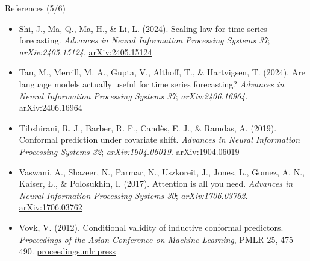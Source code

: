 \begin{frame}{References (5/6)}
\begin{itemize}
    \item Shi, J., Ma, Q., Ma, H., \& Li, L. (2024). Scaling law for time series forecasting. \textit{Advances in Neural Information Processing Systems 37}; \textit{arXiv:2405.15124}. \href{https://arxiv.org/abs/2405.15124}{arXiv:2405.15124}
    \item Tan, M., Merrill, M. A., Gupta, V., Althoff, T., \& Hartvigsen, T. (2024). Are language models actually useful for time series forecasting? \textit{Advances in Neural Information Processing Systems 37}; \textit{arXiv:2406.16964}. \href{https://arxiv.org/abs/2406.16964}{arXiv:2406.16964}
    \item Tibshirani, R. J., Barber, R. F., Candès, E. J., \& Ramdas, A. (2019). Conformal prediction under covariate shift. \textit{Advances in Neural Information Processing Systems 32}; \textit{arXiv:1904.06019}. \href{https://arxiv.org/abs/1904.06019}{arXiv:1904.06019}
    \item Vaswani, A., Shazeer, N., Parmar, N., Uszkoreit, J., Jones, L., Gomez, A. N., Kaiser, Ł., \& Polosukhin, I. (2017). Attention is all you need. \textit{Advances in Neural Information Processing Systems 30}; \textit{arXiv:1706.03762}. \href{https://arxiv.org/abs/1706.03762}{arXiv:1706.03762}
    \item Vovk, V. (2012). Conditional validity of inductive conformal predictors. \textit{Proceedings of the Asian Conference on Machine Learning}, PMLR 25, 475--490. \href{https://proceedings.mlr.press/v25/vovk12.html}{proceedings.mlr.press}
\end{itemize}
\end{frame}

